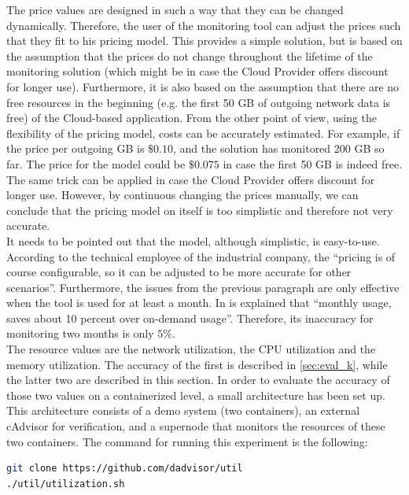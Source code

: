 \noindent
The price values are designed in such a way that they can be changed dynamically. Therefore, the user of the monitoring tool can adjust the prices such that they fit to his pricing model. This provides a simple solution, but is based on the assumption that the prices do not change throughout the lifetime of the monitoring solution (which might be in case the Cloud Provider offers discount for longer use). Furthermore, it is also based on the assumption that there are no free resources in the beginning (e.g. the first 50 GB of outgoing network data is free) of the Cloud-based application. From the other point of view, using the flexibility of the pricing model, costs can be accurately estimated. For example, if the price per outgoing GB is $\$0.10$, and the solution has monitored 200 GB so far. The price for the model could be $\$0.075$ in case the first 50 GB is indeed free. The same trick can be applied in case the Cloud Provider offers discount for longer use. However, by continuous changing the prices manually, we can conclude that the pricing model on itself is too simplistic and therefore not very accurate.\\

\noindent
It needs to be pointed out that the model, although simplistic, is easy-to-use. According to the technical employee of the industrial company, the ``pricing is of course configurable, so it can be adjusted to be more accurate for other scenarios''. Furthermore, the issues from the previous paragraph are only effective when the tool is used for at least a month. In \cite{infoworld} is explained that ``monthly usage, saves about 10 percent over on-demand usage''. Therefore, its inaccuracy for monitoring two months is only $5\%$.\\

\noindent
The resource values are the network utilization, the CPU utilization and the memory utilization. The accuracy of the first is described in \autoref{sec:eval_k}, while the latter two are described in this section. In order to evaluate the accuracy of those two values on a containerized level, a small architecture has been set up. This architecture consists of a demo system (two containers), an external cAdvisor for verification, and a supernode that monitors the resources of these two containers. The command for running this experiment is the following:

\begin{lstlisting}[language=bash, caption=Docker-compose]
git clone https://github.com/dadvisor/util
./util/utilization.sh
\end{lstlisting}

